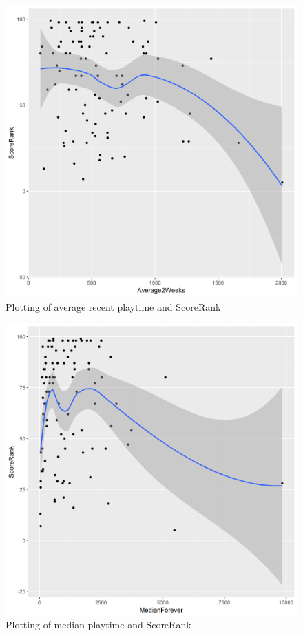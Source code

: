 \documentclass[figures_tabs.tex]{subfiles}
\begin{document}
\begin{figure}[H]
    \centering
    \includegraphics[scale=0.5]{img/avg_t.png}
    \caption{Plotting of average recent playtime and ScoreRank}
    \label{fig:avg_t}
\end{figure}

\begin{figure}[H]
    \centering
    \includegraphics[scale=0.5]{img/med_f.png}
    \caption{Plotting of median playtime and ScoreRank}
    \label{fig:med_f}
\end{figure}
\end{document}
